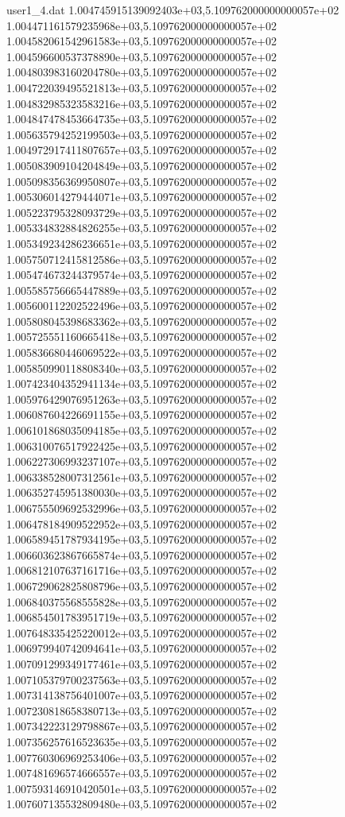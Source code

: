 \begin{filecontents}{user1_4.dat}
1.004745915139092403e+03,5.109762000000000057e+02
1.004471161579235968e+03,5.109762000000000057e+02
1.004582061542961583e+03,5.109762000000000057e+02
1.004596600537378890e+03,5.109762000000000057e+02
1.004803983160204780e+03,5.109762000000000057e+02
1.004722039495521813e+03,5.109762000000000057e+02
1.004832985323583216e+03,5.109762000000000057e+02
1.004847478453664735e+03,5.109762000000000057e+02
1.005635794252199503e+03,5.109762000000000057e+02
1.004972917411807657e+03,5.109762000000000057e+02
1.005083909104204849e+03,5.109762000000000057e+02
1.005098356369950807e+03,5.109762000000000057e+02
1.005306014279444071e+03,5.109762000000000057e+02
1.005223795328093729e+03,5.109762000000000057e+02
1.005334832884826255e+03,5.109762000000000057e+02
1.005349234286236651e+03,5.109762000000000057e+02
1.005750712415812586e+03,5.109762000000000057e+02
1.005474673244379574e+03,5.109762000000000057e+02
1.005585756665447889e+03,5.109762000000000057e+02
1.005600112202522496e+03,5.109762000000000057e+02
1.005808045398683362e+03,5.109762000000000057e+02
1.005725551160665418e+03,5.109762000000000057e+02
1.005836680446069522e+03,5.109762000000000057e+02
1.005850990118808340e+03,5.109762000000000057e+02
1.007423404352941134e+03,5.109762000000000057e+02
1.005976429076951263e+03,5.109762000000000057e+02
1.006087604226691155e+03,5.109762000000000057e+02
1.006101868035094185e+03,5.109762000000000057e+02
1.006310076517922425e+03,5.109762000000000057e+02
1.006227306993237107e+03,5.109762000000000057e+02
1.006338528007312561e+03,5.109762000000000057e+02
1.006352745951380030e+03,5.109762000000000057e+02
1.006755509692532996e+03,5.109762000000000057e+02
1.006478184909522952e+03,5.109762000000000057e+02
1.006589451787934195e+03,5.109762000000000057e+02
1.006603623867665874e+03,5.109762000000000057e+02
1.006812107637161716e+03,5.109762000000000057e+02
1.006729062825808796e+03,5.109762000000000057e+02
1.006840375568555828e+03,5.109762000000000057e+02
1.006854501783951719e+03,5.109762000000000057e+02
1.007648335425220012e+03,5.109762000000000057e+02
1.006979940742094641e+03,5.109762000000000057e+02
1.007091299349177461e+03,5.109762000000000057e+02
1.007105379700237563e+03,5.109762000000000057e+02
1.007314138756401007e+03,5.109762000000000057e+02
1.007230818658380713e+03,5.109762000000000057e+02
1.007342223129798867e+03,5.109762000000000057e+02
1.007356257616523635e+03,5.109762000000000057e+02
1.007760306969253406e+03,5.109762000000000057e+02
1.007481696574666557e+03,5.109762000000000057e+02
1.007593146910420501e+03,5.109762000000000057e+02
1.007607135532809480e+03,5.109762000000000057e+02

\end{filecontents}
